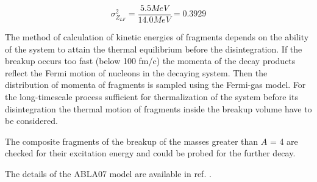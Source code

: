 \begin{equation}
	\sigma_{Z_{LF}}^{2} = \frac{5.5MeV}{14.0 MeV}=0.3929
\end{equation}

The method of calculation of kinetic energies of fragments depends on the ability of the system to attain the thermal equilibrium before  the disintegration. If the breakup occurs too fast (below 100 fm/c) the momenta of the decay products reflect the Fermi motion of nucleons in the decaying system. Then the distribution of momenta of fragments is sampled using the Fermi-gas model. 
For the long-timescale process sufficient for thermalization of the system before its disintegration the thermal motion 
of fragments inside the breakup volume have to be considered. 

The composite fragments of the breakup of the 
masses greater than $A$ = 4 are checked for their excitation energy and could be probed for the further decay.  

The details of the ABLA07 model are available 
in ref. \cite{kelic2009abla07}.

